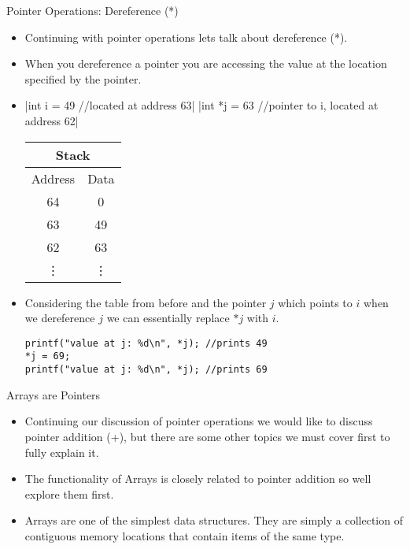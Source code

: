 \documentclass[10pt]{beamer}
\begin{document}
\begin{frame}[fragile]{Pointer Operations: Dereference (*)}
	\begin{itemize}[<+->]
		\item Continuing with pointer operations lets talk about dereference (*).
		\item When you dereference a pointer you are accessing the value at the location specified by the pointer.
		\item
		|int i = 49 //located at address 63|
		|int *j = 63 //pointer to i, located at address 62|
		\begin{tabular}{|c|c|}
			\hline
			\multicolumn{2}{|c|}{Stack}\\
			\hline
			Address & Data\\
			\hline
			64 &	0\\
			\hline
			63 &	49\\
			\hline
			62 &	63\\
			\hline
			\vdots & \vdots \\
			\hline
		\end{tabular}

		\item Considering the table from before and the pointer $j$ which points to $i$ when we dereference $j$ we can essentially replace $*j$ with $i$.

		\begin{verbatim}
printf("value at j: %d\n", *j); //prints 49
*j = 69;
printf("value at j: %d\n", *j); //prints 69
		\end{verbatim}

	\end{itemize}
\end{frame}


\begin{frame}[fragile]{Arrays are Pointers}
	\begin{itemize}[<+->]
	\item Continuing our discussion of pointer operations we would like to discuss pointer addition (+), but there are some other topics we must cover first to fully explain it.
	\item The functionality of Arrays is closely related to pointer addition so well explore them first.
	\item Arrays are one of the simplest data structures. They are simply a collection of contiguous memory locations that contain items of the same type.
	\end{itemize}
\end{frame}
\end{document}
